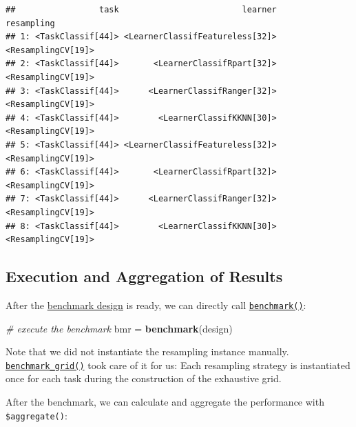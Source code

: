 \documentclass[]{scrbook}
\newenvironment{Shaded}{\begin{snugshade}}{\end{snugshade}}
\newcommand{\CommentTok}[1]{\textcolor[rgb]{0.56,0.35,0.01}{\textit{#1}}}
\newcommand{\DataTypeTok}[1]{\textcolor[rgb]{0.13,0.29,0.53}{#1}}
\newcommand{\KeywordTok}[1]{\textcolor[rgb]{0.13,0.29,0.53}{\textbf{#1}}}
\newcommand{\NormalTok}[1]{#1}
\newcommand{\OperatorTok}[1]{\textcolor[rgb]{0.81,0.36,0.00}{\textbf{#1}}}
\newcommand{\StringTok}[1]{\textcolor[rgb]{0.31,0.60,0.02}{#1}}
\renewenvironment{Shaded} {\begin{snugshade}\small} {\end{snugshade}}
\begin{document}
\begin{verbatim}
##                 task                         learner         resampling
## 1: <TaskClassif[44]> <LearnerClassifFeatureless[32]> <ResamplingCV[19]>
## 2: <TaskClassif[44]>       <LearnerClassifRpart[32]> <ResamplingCV[19]>
## 3: <TaskClassif[44]>      <LearnerClassifRanger[32]> <ResamplingCV[19]>
## 4: <TaskClassif[44]>        <LearnerClassifKKNN[30]> <ResamplingCV[19]>
## 5: <TaskClassif[44]> <LearnerClassifFeatureless[32]> <ResamplingCV[19]>
## 6: <TaskClassif[44]>       <LearnerClassifRpart[32]> <ResamplingCV[19]>
## 7: <TaskClassif[44]>      <LearnerClassifRanger[32]> <ResamplingCV[19]>
## 8: <TaskClassif[44]>        <LearnerClassifKKNN[30]> <ResamplingCV[19]>
\end{verbatim}

\hypertarget{bm-exec}{%
\subsection{Execution and Aggregation of Results}\label{bm-exec}}

After the \protect\hyperlink{bm-design}{benchmark design} is ready, we can directly call \href{https://mlr3.mlr-org.com/reference/benchmark.html}{\texttt{benchmark()}}:

\begin{Shaded}
\begin{Highlighting}[]
\CommentTok{# execute the benchmark}
\NormalTok{bmr =}\StringTok{ }\KeywordTok{benchmark}\NormalTok{(design)}
\end{Highlighting}
\end{Shaded}

Note that we did not instantiate the resampling instance manually.
\href{https://mlr3.mlr-org.com/reference/benchmark_grid.html}{\texttt{benchmark\_grid()}} took care of it for us:
Each resampling strategy is instantiated once for each task during the construction of the exhaustive grid.

After the benchmark, we can calculate and aggregate the performance with \texttt{\$aggregate()}:

\begin{Shaded}
\end{Shaded}
\end{document}
